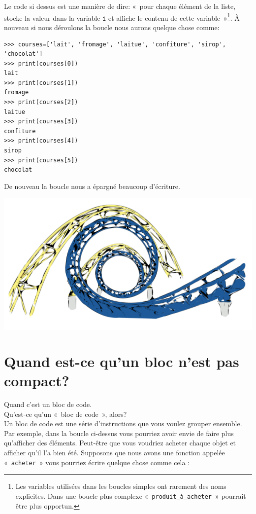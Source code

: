 Le code si dessus est une manière de dire: «~pour chaque élément de la liste, stocke la valeur dans la variable \texttt{i} et affiche le contenu de cette variable~»\footnote{Les variables utilisées dans les boucles simples ont rarement des noms explicites. Dans une boucle plus complexe «~\texttt{produit\_à\_acheter}~» pourrait être plus opportun.}.  À nouveau si nous déroulons la boucle nous aurons quelque chose comme:

\begin{small}
\begin{Verbatim}[frame=single,rulecolor=\color{gray}, label=ne pas saisir]
>>> courses=['lait', 'fromage', 'laitue', 'confiture', 'sirop', 'chocolat']
>>> print(courses[0])
lait
>>> print(courses[1])
fromage
>>> print(courses[2])
laitue
>>> print(courses[3])
confiture
>>> print(courses[4])
sirop
>>> print(courses[5])
chocolat
\end{Verbatim}
\end{small}

De nouveau la boucle nous a épargné beaucoup d'écriture.

\begin{center}
\includegraphics[scale=.2]{images/SteveLambert_Roller_Coaster_Tracks.pdf} 
\end{center}


\section{Quand est-ce qu'un bloc n'est pas compact?}
Quand c'est un bloc de code.\\

Qu'est-ce qu'un «~bloc de code~», alors?\\

Un bloc de code est une série d'instructions que vous voulez grouper ensemble.
Par exemple, dans la boucle ci-dessus vous pourriez avoir envie de faire plus qu'afficher des éléments. 
Peut-être que vous voudriez acheter chaque objet et afficher qu'il l'a bien été.
Supposons que nous avons une fonction appelée «~\texttt{acheter}~» vous pourriez écrire quelque chose comme cela :

